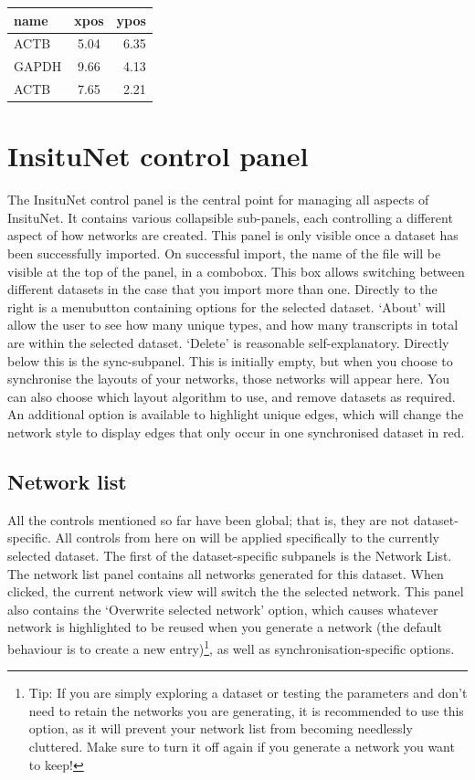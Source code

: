 \documentclass[a4paper,12pt]{article}
\begin{document}
\begin{center}
\begin{tabular}{ l c r }
	\centering
	name & xpos & ypos \\ \hline
	ACTB & 5.04 & 6.35 \\
	GAPDH & 9.66 & 4.13 \\
	ACTB & 7.65 & 2.21 \\
\end{tabular}
\end{center}

\section{InsituNet control panel}

The InsituNet control panel is the central point for managing all aspects of InsituNet. It contains various collapsible sub-panels, each controlling a different aspect of how networks are created. This panel is only visible once a dataset has been successfully imported. On successful import, the name of the file will be visible at the top of the panel, in a combobox. This box allows switching between different datasets in the case that you import more than one. Directly to the right is a menubutton containing options for the selected dataset. `About' will allow the user to see how many unique types, and how many transcripts in total are within the selected dataset. `Delete' is reasonable self-explanatory. Directly below this is the sync-subpanel. This is initially empty, but when you choose to synchronise the layouts of your networks, those networks will appear here. You can also choose which layout algorithm to use, and remove datasets as required. An additional option is available to highlight unique edges, which will change the network style to display edges that only occur in one synchronised dataset in red.

\subsection{Network list}
All the controls mentioned so far have been global; that is, they are not dataset-specific. All controls from here on will be applied specifically to the currently selected dataset. The first of the dataset-specific subpanels is the Network List. The network list panel contains all networks generated for this dataset. When clicked, the current network view will switch the the selected network. This panel also contains the `Overwrite selected network' option, which causes whatever network is highlighted to be reused when you generate a network (the default behaviour is to create a new entry)\footnote{Tip: If you are simply exploring a dataset or testing the parameters and don't need to retain the networks you are generating, it is recommended to use this option, as it will prevent your network list from becoming needlessly cluttered. Make sure to turn it off again if you generate a network you want to keep!}, as well as synchronisation-specific options.
\end{document}

